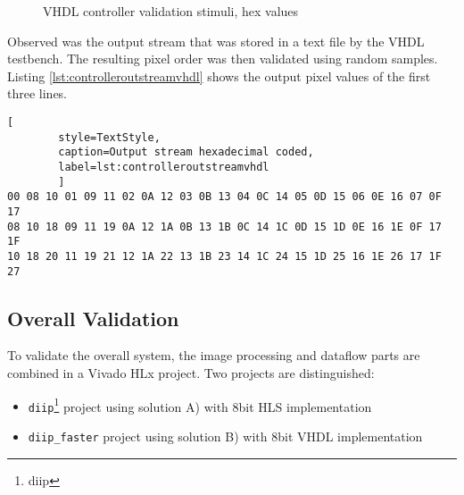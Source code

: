  \begin{figure}[h!]
    \centering
    \begin{adjustbox}{max width=\linewidth}
        
    \end{adjustbox}
    \caption{VHDL controller validation stimuli, hex values}
    \label{fig:vhdlcontrollerstimuli}
\end{figure}

Observed was the output stream that was stored in a text file by the VHDL
testbench. The resulting pixel order was then validated using random samples.
Listing \ref{lst:controlleroutstreamvhdl} shows the output pixel values of the
first three lines.

\begin{minipage}{\linewidth}
    \begin{lstlisting}[
        style=TextStyle, 
        caption=Output stream hexadecimal coded, 
        label=lst:controlleroutstreamvhdl
        ]
00 08 10 01 09 11 02 0A 12 03 0B 13 04 0C 14 05 0D 15 06 0E 16 07 0F 17 
08 10 18 09 11 19 0A 12 1A 0B 13 1B 0C 14 1C 0D 15 1D 0E 16 1E 0F 17 1F
10 18 20 11 19 21 12 1A 22 13 1B 23 14 1C 24 15 1D 25 16 1E 26 17 1F 27\end{lstlisting}
\end{minipage}

%
%
\subsection{Overall Validation}\label{ch:verification:overallvalidation}
To validate the overall system, the image processing and dataflow parts are
combined in a Vivado HLx project. Two projects are distinguished:
\begin{itemize}
    \item \texttt{diip}\footnote{\Gls{diip}} project using solution A) with 8bit HLS
    implementation
    \item \texttt{diip\_faster} project using solution B) with 8bit VHDL
    implementation
\end{itemize}

